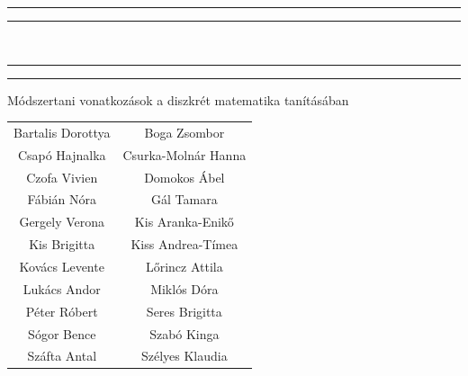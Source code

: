 \begin{titlepage}

\centering %
		
\scshape %

\vspace*{\baselineskip} %


\rule{\textwidth}{1.6pt}\vspace*{-\baselineskip}\vspace*{2pt} %
\rule{\textwidth}{0.4pt} %

\vspace{0.75\baselineskip} %

{\Huge {}\\} %

\vspace{0.75\baselineskip} %

\rule{\textwidth}{0.4pt}\vspace*{-\baselineskip}\vspace{3.2pt} %
\rule{\textwidth}{1.6pt} %

\vspace{2\baselineskip} %


\vspace*{2\baselineskip} %

{\Huge Módszertani vonatkozások a diszkrét matematika tanításában \par} 

\vspace*{5\baselineskip} %




{\scshape   \Large
\begin{tabular}{cc}
	Bartalis Dorottya & Boga Zsombor\tabularnewline
	Csapó Hajnalka & Csurka-Molnár Hanna \tabularnewline
	Czofa Vivien & Domokos Ábel\tabularnewline
	Fábián Nóra & Gál Tamara\tabularnewline
	Gergely Verona & Kis Aranka-Enikő\tabularnewline
	Kis Brigitta & Kiss Andrea-Tímea\tabularnewline
	Kovács Levente & Lőrincz Attila\tabularnewline
	Lukács Andor & Miklós Dóra\tabularnewline
	Péter Róbert & Seres Brigitta\tabularnewline
	Sógor Bence & Szabó Kinga\tabularnewline
	Száfta Antal & Szélyes Klaudia\tabularnewline
\end{tabular}
}
\vspace{5\baselineskip} 


\end{titlepage}
